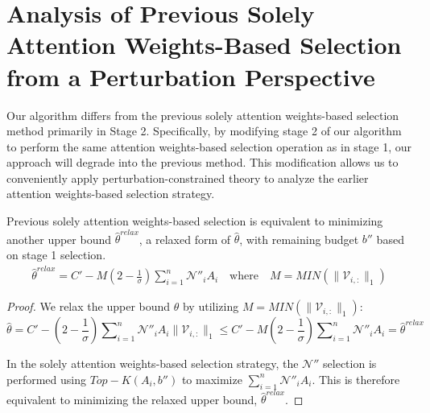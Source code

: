 {




\section{Analysis of Previous Solely Attention Weights-Based Selection from a Perturbation Perspective}
Our algorithm differs from the previous solely attention weights-based selection method primarily in Stage 2. Specifically, by modifying stage 2 of our algorithm to perform the same attention weights-based selection operation as in stage 1, our approach will degrade into the previous method. This modification allows us to conveniently apply perturbation-constrained theory to analyze the earlier attention weights-based selection strategy.
\begin{theorem}
	\label{thm:attn_weights_select}
	Previous solely attention weights-based selection is equivalent to minimizing another upper bound $\hat{\theta}^{relax}$, a relaxed form of $\hat{\theta}$, with remaining budget $b''$ based on stage 1 selection.	 
	\begin{align}
		\hat{\theta}^{relax} =  C' - M\left(2- \frac{1}{\sigma}\right)\sum\nolimits_{i=1}^{n}  \mathcal{N}''_i A_i \quad \text{where} \quad M = MIN(\lVert \boldsymbol{\mathcal{V}}_{i,:} \rVert_1 )
	\end{align}
\end{theorem}
\begin{proof}
	We relax the upper bound $\hat{\theta}$ by utilizing $M = MIN(\lVert \boldsymbol{\mathcal{V}}_{i,:} \rVert_1 )$:
	\begin{equation}
		\hat{\theta} =  C' - \left(2- \frac{1}{\sigma}\right)\sum\nolimits_{i=1}^{n} \mathcal{N}''_i A_i \lVert \boldsymbol{\mathcal{V}}_{i,:}  \rVert_1 \leq C' - M \left(2- \frac{1}{\sigma}\right)\sum\nolimits_{i=1}^{n} \mathcal{N}''_i A_i  = \hat{\theta}^{relax}
	\end{equation}

	
	In the solely attention weights-based selection strategy, the $\mathcal{N}''$ selection is performed using \(Top-K(A_i, b'')\) to maximize \(\sum\nolimits_{i=1}^{n} \mathcal{N}''_i A_i\). This is therefore equivalent to minimizing the relaxed upper bound, \(\hat{\theta}^{relax}\).


\end{proof}}
